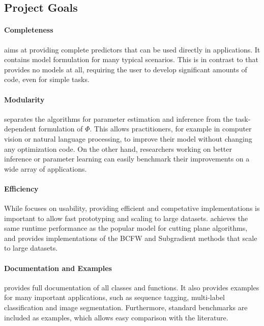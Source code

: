 \subsection{Project Goals}\label{sec:goals}

\paragraph{Completeness}
    \pystruct aims at providing complete predictors that can be used directly in
    applications. It contains model formulation for many typical scenarios.
    This is in contrast to \svmstruct that provides no models at all, requiring the
    user to develop significant amounts of code, even for simple tasks.

\paragraph{Modularity}
    \pystruct separates the algorithms for parameter estimation and
     inference from the task-dependent formulation of $\Phi$. This allows
     practitioners, for example in computer vision or natural language
     processing, to improve their model without changing any optimization
     code. On the other hand, researchers working on better inference or
     parameter learning can easily benchmark their improvements on a wide
     array of applications.

\paragraph{Efficiency}
     While \pystruct focuses on usability, providing efficient and competative
     implementations is important to allow fast prototyping and scaling to
     large datasets. \pystruct achieves the same runtime performance
     as the popular \svmstruct model for cutting plane algorithms, and
     provides implementations of the BCFW and Subgradient methods that scale to
     large datasets.

\paragraph{Documentation and Examples}
     \pystruct provides full documentation of all classes and functions.  It
     also provides examples for many important applications, such as
     sequence tagging, multi-label classification and image segmentation.
     Furthermore, standard benchmarks are included as examples, which allows
     easy comparison with the literature.

